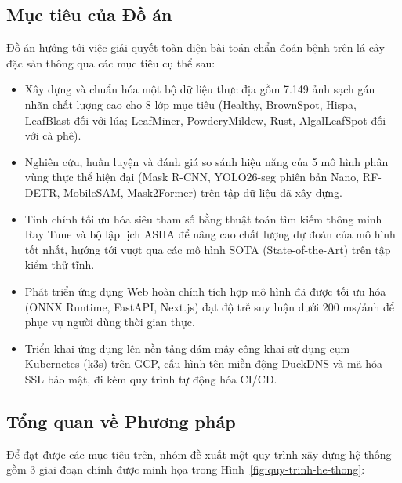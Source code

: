 \subsection{Mục tiêu của Đồ án}
Đồ án hướng tới việc giải quyết toàn diện bài toán chẩn đoán bệnh trên lá cây đặc sản thông qua các mục tiêu cụ thể sau:
\begin{itemize}
  \item Xây dựng và chuẩn hóa một bộ dữ liệu thực địa gồm 7.149 ảnh sạch gán nhãn chất lượng cao cho 8 lớp mục tiêu (Healthy, BrownSpot, Hispa, LeafBlast đối với lúa; LeafMiner, PowderyMildew, Rust, AlgalLeafSpot đối với cà phê).
  \item Nghiên cứu, huấn luyện và đánh giá so sánh hiệu năng của 5 mô hình phân vùng thực thể hiện đại (Mask R-CNN, YOLO26-seg phiên bản Nano, RF-DETR, MobileSAM, Mask2Former) trên tập dữ liệu đã xây dựng.
  \item Tinh chỉnh tối ưu hóa siêu tham số bằng thuật toán tìm kiếm thông minh Ray Tune và bộ lập lịch ASHA để nâng cao chất lượng dự đoán của mô hình tốt nhất, hướng tới vượt qua các mô hình SOTA (State-of-the-Art) trên tập kiểm thử tĩnh.
  \item Phát triển ứng dụng Web hoàn chỉnh tích hợp mô hình đã được tối ưu hóa (ONNX Runtime, FastAPI, Next.js) đạt độ trễ suy luận dưới 200 ms/ảnh để phục vụ người dùng thời gian thực.
  \item Triển khai ứng dụng lên nền tảng đám mây công khai sử dụng cụm Kubernetes (k3s) trên GCP, cấu hình tên miền động DuckDNS và mã hóa SSL bảo mật, đi kèm quy trình tự động hóa CI/CD.
\end{itemize}

\subsection{Tổng quan về Phương pháp}
Để đạt được các mục tiêu trên, nhóm đề xuất một quy trình xây dựng hệ thống gồm 3 giai đoạn chính được minh họa trong Hình~\ref{fig:quy-trinh-he-thong}:

